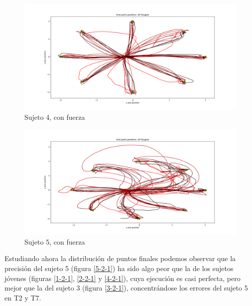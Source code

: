 \documentclass[a4paper,11pt, oneside]{book}
\begin{document}
\begin{figure}[H]
	\includegraphics[width=\linewidth]{sujeto4/force/trayectorias}
	\caption{Sujeto 4, con fuerza}
	\label{4-2-0}
\end{figure}
\begin{figure}[H]
	\includegraphics[width=\linewidth]{sujeto5/force/trayectorias}
	\caption{Sujeto 5, con fuerza}
	\label{5-2-0}
\end{figure}


Estudiando ahora la distribución de puntos finales podemos observar que la precisión del sujeto 5 (figura \ref{5-2-1}) ha sido algo peor que la de los sujetos jóvenes (figuras \ref{1-2-1}, \ref{2-2-1} y \ref{4-2-1}), cuya ejecución es casi perfecta, pero mejor que la del sujeto 3 (figura \ref{3-2-1}), concentrándose los errores del sujeto 5 en T2 y T7. 
\end{document}
